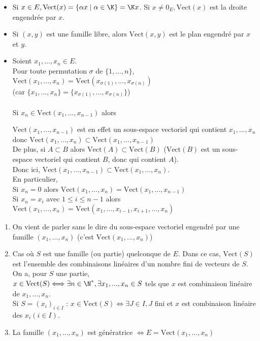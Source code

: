\documentclass[12pt, a4paper]{report}
\begin{document}
\begin{remarque}{}
\begin{itemize}
	\item Si $x \in E, \text{Vect}(x) = \{\alpha x \mid \alpha \in \K \} = \K x$. Si $x \ne 0_E, \text{Vect}(x)$ est la droite engendrée par $x$.
	\item Si $(x,y)$ est une famille libre, alors $\text{Vect}(x,y)$ est le plan engendré par $x$ et $y$.
	\item Soient $x_1,...,x_n \in E$. \\
	Pour toute permutation $\sigma$ de $\{1,...,n \}$, $\text{Vect}(x_1,...,x_n) = \text{Vect}(x_{\sigma(1)}, ..., x_{\sigma(n)})$ \\
	(car $\{ x_1,...,x_n \} = \{ x_{\sigma(1)},...,x_{\sigma(n)} \}$) \\ \\
	Si $x_n \in \text{Vect}(x_1,...,x_{n-1})$ alors 
	
	\begin{demo}{}
	$\text{Vect}(x_1,...,x_{n-1})$ est en effet un sous-espace vectoriel qui contient $x_1,...,x_n$ donc $\text{Vect}(x_1,...,x_n) \subset \text{Vect}(x_1,...,x_{n-1})$ \\
	De plus, si $A \subset B$ alors $\text{Vect}(A) \subset \text{Vect}(B)$ ($\text{Vect}(B)$ est un sous-espace vectoriel qui contient $B$, donc qui contient $A$). \\
	Donc ici, $\text{Vect}(x_1,...,x_{n-1}) \subset \text{Vect}(x_1,...,x_n)$. \\
	En particulier, \\
	Si $x_n = 0$ alors $\text{Vect}(x_1,...,x_n) = \text{Vect}(x_1,...,x_{n-1})$ \\
	Si $x_n = x_i$ avec $1 \le i \le n-1$ alors $\text{Vect}(x_1,...,x_n) = \text{Vect}(x_1,...,x_{i-1},x_{i+1},...,x_n)$
	\end{demo}
\end{itemize}
\end{remarque}

\begin{remarque}{}
\begin{enumerate}
	\item On vient de parler sans le dire du sous-espace vectoriel engendré par une famille $(x_1,...,x_n)$ (c'est $\text{Vect}(x_1,...,x_n)$)
	\item Cas où $S$ est une famille (ou partie) quelconque de $E$. Dans ce cas, $\text{Vect}(S)$ est l'ensemble des combinaisons linéaires d'un nombre fini de vecteurs de $S$. \\
	On a, pour $S$ une partie, \\
	$x \in \text{Vect}(S) \Longleftrightarrow \exists n \in \N^*, \exists x_1,...,x_n \in S$ tels que $x$ est combinaison linéaire de $x_1,...,x_n$. \\
	Si $S = (x_i)_{i \in I}$ : $x \in \text{Vect}(S) \Longleftrightarrow \exists J \in I, J$ fini et $x$ est combinaison linéaire des $x_i (i \in I)$.
	\item La famille $(x_1,...,x_n)$ est génératrice $\Longleftrightarrow E = \text{Vect}(x_1,...,x_n)$
\end{enumerate}
\end{remarque}
\end{document}
